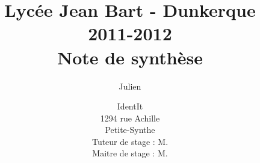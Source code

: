 \documentclass[12pt,a4paper,draft]{report}
\title
{
	\normalsize{Lycée Jean Bart - Dunkerque\\
	2011-2012}\\
	\vspace{15mm}
	\Huge{Note de synthèse}
}
\author{\bsc{Stechele} Julien\\
	\vspace{45mm}
}
\date{
	\normalsize{IdentIt\\
    1294 rue Achille \bsc{Pérès}\\
	Petite-Synthe\\
	\vspace{5mm}
    Tuteur de stage : M.\bsc{Anselin}\\
	Maitre de stage : M.\bsc{Dubourg}
	}
}
\begin{document}
\maketitle



\tableofcontents
\clearpage

\begin{onehalfspace}













\end{onehalfspace}
\end{document}
